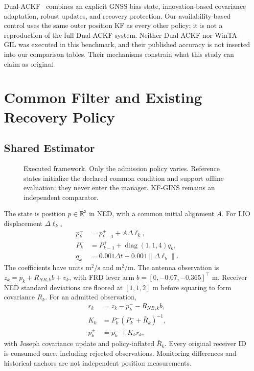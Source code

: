 \documentclass[conference]{IEEEtran}
\begin{document}
Dual-ACKF~\cite{dual} combines an explicit GNSS bias state, innovation-based covariance adaptation, robust updates, and recovery protection. Our availability-based control uses the same outer position KF as every other policy; it is not a reproduction of the full Dual-ACKF system. Neither Dual-ACKF nor WinTA-GIL was executed in this benchmark, and their published accuracy is not inserted into our comparison tables. Their mechanisms constrain what this study can claim as original.

\section{Common Filter and Existing Recovery Policy}
\subsection{Shared Estimator}
\begin{figure}[t]
\centering

\caption{Executed framework. Only the admission policy varies. Reference states initialize the declared common condition and support offline evaluation; they never enter the manager. KF-GINS remains an independent comparator.}
\label{fig:framework}
\end{figure}
The state is position $p\in\mathbb{R}^{3}$ in NED, with a common initial alignment $A$. For LIO displacement $\Delta\ell_k$,
\begin{align}
 p_k^-&=p_{k-1}^++A\Delta\ell_k,\\
 P_k^-&=P_{k-1}^++\operatorname{diag}(1,1,4)q_k,\\
 q_k&=0.001\Delta t+0.001\|\Delta\ell_k\|.
\end{align}
The coefficients have units $\mathrm{m^2/s}$ and $\mathrm{m^2/m}$. The antenna observation is $z_k=p_k+R_{NB,k}b+v_k$, with FRD lever arm $b=[0,-0.07,-0.365]^\top$ m. Receiver NED standard deviations are floored at $[1,1,2]$ m before squaring to form covariance $R_k$. For an admitted observation,
\begin{align}
 r_k&=z_k-p_k^--R_{NB,k}b,\\
 K_k&=P_k^-(P_k^-+\bar R_k)^{-1},\\
 p_k^+&=p_k^-+K_kr_k,
\end{align}
with Joseph covariance update and policy-inflated $\bar R_k$. Every original receiver ID is consumed once, including rejected observations. Monitoring differences and historical anchors are not independent position measurements.
\end{document}
